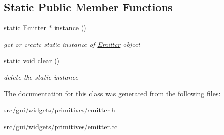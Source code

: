 \subsection*{Static Public Member Functions}
\begin{DoxyCompactItemize}
\item 
static \hyperlink{classprim_1_1Emitter}{Emitter} $\ast$ \hyperlink{classprim_1_1Emitter_a8a8b61c4476a094114c8dc51501e99f3}{instance} ()\hypertarget{classprim_1_1Emitter_a8a8b61c4476a094114c8dc51501e99f3}{}\label{classprim_1_1Emitter_a8a8b61c4476a094114c8dc51501e99f3}

\begin{DoxyCompactList}\small\item\em get or create static instance of \hyperlink{classprim_1_1Emitter}{Emitter} object \end{DoxyCompactList}\item 
static void \hyperlink{classprim_1_1Emitter_a3ac1e476e833c1249705f976f828a597}{clear} ()\hypertarget{classprim_1_1Emitter_a3ac1e476e833c1249705f976f828a597}{}\label{classprim_1_1Emitter_a3ac1e476e833c1249705f976f828a597}

\begin{DoxyCompactList}\small\item\em delete the static instance \end{DoxyCompactList}\end{DoxyCompactItemize}


The documentation for this class was generated from the following files\+:\begin{DoxyCompactItemize}
\item 
src/gui/widgets/primitives/\hyperlink{emitter_8h}{emitter.\+h}\item 
src/gui/widgets/primitives/emitter.\+cc\end{DoxyCompactItemize}

